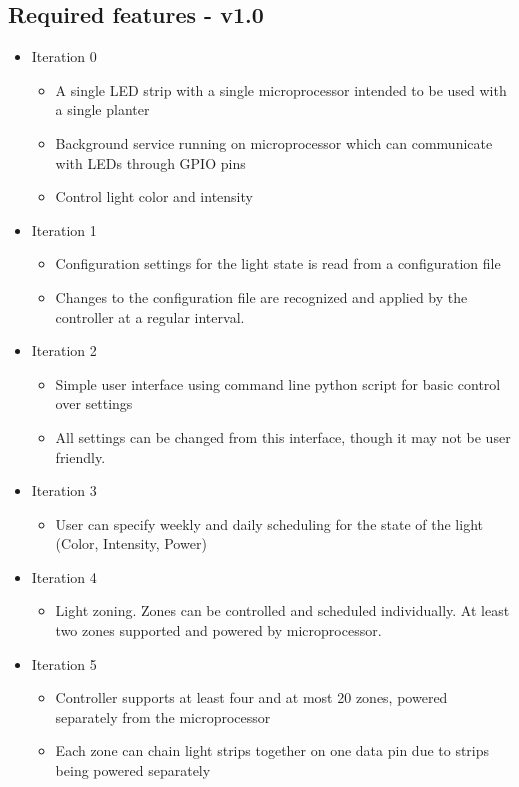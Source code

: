 \documentclass[onecolumn, draftclsnofoot,10pt, compsoc]{IEEEtran}
\begin{document}
		\subsection*{Required features - v1.0}
			\begin{itemize}
				\item Iteration 0
						\begin{itemize}
						\item A single LED strip with a single microprocessor intended to be used with a single planter
						\item Background service running on microprocessor which can communicate with LEDs through GPIO pins
						\item Control light color and intensity
					\end{itemize}
						\item Iteration 1
					\begin{itemize}
						\item Configuration settings for the light state is read from a configuration file
						\item Changes to the configuration file are recognized and applied by the controller at a regular interval.
					\end{itemize}

				\item Iteration 2
					\begin{itemize}
						\item Simple user interface using command line python script for basic control over settings
						\item All settings can be changed from this interface, though it may not be user friendly.
					\end{itemize}
				\item Iteration 3
					\begin{itemize}
						\item User can specify weekly and daily scheduling for the state of the light (Color, Intensity, Power)
					\end{itemize}
				\item Iteration 4
					\begin{itemize}
						\item  Light zoning. Zones can be controlled and scheduled individually. At least two zones supported and powered by microprocessor.
					\end{itemize}
				\item Iteration 5
					\begin{itemize}
						\item Controller supports at least four and at most 20 zones, powered separately from the microprocessor
						\item Each zone can chain light strips together on one data pin due to strips being powered separately
					\end{itemize}
			\end{itemize}
\end{document}
